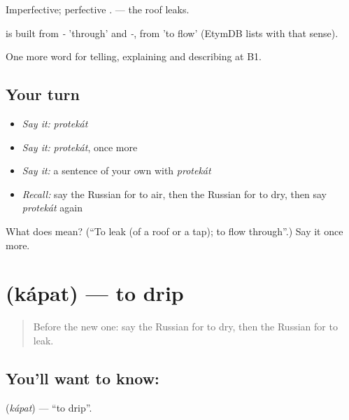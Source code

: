 Imperfective; perfective \emph{}. \emph{ } — the roof leaks.

\begin{cousinweb}
\emph{} is built from \emph{-} 'through' and \emph{-}, from \emph{} 'to flow' (EtymDB lists \emph{} with that sense).
\end{cousinweb}

\begin{grammarlens}[title={What you've built}]
One more word for telling, explaining and describing at B1.
\end{grammarlens}

\subsection*{Your turn}
\begin{itemize}
\raggedright
  \item \emph{Say it:} \emph{protekát}
  \item \emph{Say it:} \emph{protekát}, once more
  \item \emph{Say it:} a sentence of your own with \emph{protekát}
  \item \emph{Recall:} say the Russian for to air, then the Russian for to dry, then say \emph{protekát} again
\end{itemize}

\begin{tcolorbox}[breakable,colback=teal!4,colframe=teal!35!black,title={Before you move on}]
What does  mean? (\textquotedblleft{}To leak (of a roof or a tap); to flow through\textquotedblright{}.) Say it once more.
\end{tcolorbox}
\section[\texorpdfstring{\ru{капать} (kápat)}{капать (kápat)}]{ (kápat) — to drip}

\label{lesson:RU-C432-kapat}



\begin{quote}
Before the new one: say the Russian for to dry, then the Russian for to leak.
\end{quote}

\subsection*{You'll want to know: }
\textbf{} (\emph{kápat}) — \textquotedblleft{}to drip\textquotedblright{}.

